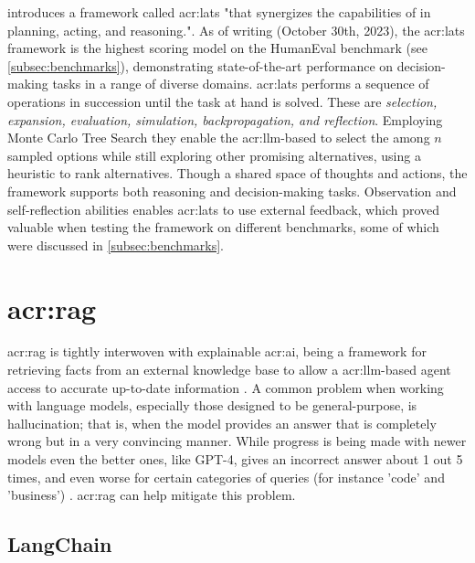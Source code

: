 \cite{zhouLanguageAgentTree2023} introduces a framework called \gls{acr:lats} "that synergizes the capabilities of  in planning, acting, and reasoning.". As of writing (October 30th, 2023), the \gls{acr:lats} framework is the highest scoring model on the HumanEval benchmark (see \autoref{subsec:benchmarks}), demonstrating state-of-the-art performance on decision-making tasks in a range of diverse domains. \gls{acr:lats} performs a sequence of operations in succession until the task at hand is solved. These are \textit{selection, expansion, evaluation, simulation, backpropagation, and reflection}. Employing Monte Carlo Tree Search they enable the \acrshort{acr:llm}-based to select the among $n$ sampled options while still exploring other promising alternatives, using a heuristic to rank alternatives. Though a shared space of thoughts and actions, the framework supports both reasoning and decision-making tasks. Observation and self-reflection abilities enables \acrshort{acr:lats} to use external feedback, which proved valuable when testing the framework on different benchmarks, some of which were discussed in \autoref{subsec:benchmarks}.



\section[Retrieval Augmented Generation]{\acrlong{acr:rag}}\label{sec:retrieval-automented-generation}

\gls{acr:rag} is tightly interwoven with explainable \acrshort{acr:ai}, being a framework for retrieving facts from an external knowledge base to allow a \acrshort{acr:llm}-based agent access to accurate up-to-date information \citep{martineauWhatRetrievalaugmentedGeneration2023}. A common problem when working with language models, especially those designed to be general-purpose, is hallucination; that is, when the model provides an answer that is completely wrong but in a very convincing manner. While progress is being made with newer models even the better ones, like GPT-4, gives an incorrect answer about 1 out 5 times, and even worse for certain categories of queries (for instance 'code' and 'business') \citep[10]{openaiGPT4TechnicalReport2023}. \acrlong{acr:rag} can help mitigate this problem.

\subsection{LangChain}\label{subsubsec:langchain}

